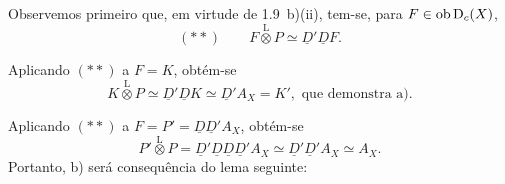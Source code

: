 Observemos primeiro que, em virtude de 1.9~b)(ii), tem-se, para $F \in \operatorname{ob} \mathrm{D}_c(X)$,
\[
(**) \qquad F \mathop{\otimes}\limits^{\mathrm{L}} P \simeq \underline{D}'\underline{D} F.
\]

Aplicando $(**)$ a $F = K$, obtém-se
\[
K \mathop{\otimes}\limits^{\mathrm{L}} P \simeq \underline{D}'\underline{D} K \simeq \underline{D}' A_X = K', \text{ que demonstra a).}
\]

Aplicando $(**)$ a $F = P' = \underline{D}\underline{D}'A_X$, obtém-se
\[
P' \mathop{\otimes}\limits^{\mathrm{L}} P = \underline{D}'\underline{D}\underline{D}\underline{D}'A_X \simeq \underline{D}'\underline{D}'A_X \simeq A_X.
\]
Portanto, b) será consequência do lema seguinte:

